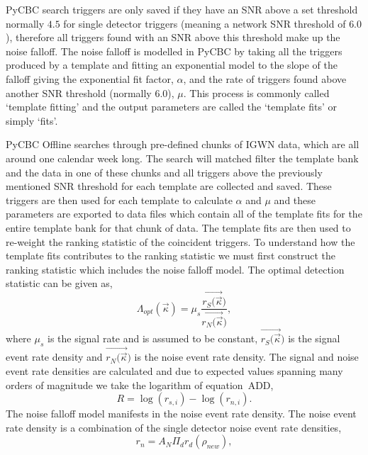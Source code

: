 PyCBC search triggers are only saved if they have an SNR above a set threshold normally $4.5$ for single detector triggers (meaning a network SNR threshold of $6.0$), therefore all triggers found with an SNR above this threshold make up the noise falloff. The noise falloff is modelled in PyCBC by taking all the triggers produced by a template and fitting an exponential model to the slope of the falloff giving the exponential fit factor, $\alpha$, and the rate of triggers found above another SNR threshold (normally $6.0$), $\mu$. This process is commonly called `template fitting' and the output parameters are called the `template fits' or simply `fits'.

PyCBC Offline searches through pre-defined chunks of IGWN data, which are all around one calendar week long. The search will matched filter the template bank and the data in one of these chunks and all triggers above the previously mentioned SNR threshold for each template are collected and saved. These triggers are then used for each template to calculate $\alpha$ and $\mu$ and these parameters are exported to data files which contain all of the template fits for the entire template bank for that chunk of data.
%
%
The template fits are then used to re-weight the ranking statistic of the coincident triggers. To understand how the template fits contributes to the ranking statistic we must first construct the ranking statistic which includes the noise falloff model. The optimal detection statistic can be given as,
%
\begin{equation}
    \Lambda_{opt}(\Vec{\kappa}) = \mu_{s} \frac{\Vec{r_{S}(\Vec{\kappa}})}{\Vec{r_{N}(\Vec{\kappa}})} ,
\end{equation}
where $\mu_{s}$ is the signal rate and is assumed to be constant, $\Vec{r_{S}(\Vec{\kappa}})$ is the signal event rate density and $\Vec{r_{N}(\Vec{\kappa}})$ is the noise event rate density. The signal and noise event rate densities are calculated and due to expected values spanning many orders of magnitude we take the logarithm of equation~ADD,
%
\begin{equation}
    R = \log(r_{s,i}) - \log(r_{n,i}) .
\end{equation}
The noise falloff model manifests in the noise event rate density. The noise event rate density is a combination of the single detector noise event rate densities,
%
\begin{equation}
    r_{n} = A_{N} \Pi_{d} r_{d}(\rho_{new}) ,
\label{eqn:pycbclive-comb-noise-rate}
\end{equation}
